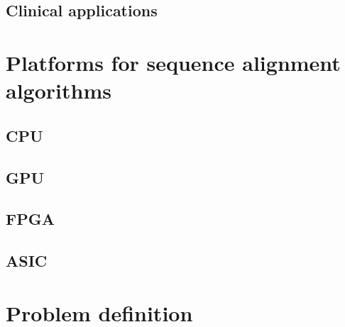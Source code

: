 \subsection{Clinical applications}


\section{Platforms for sequence alignment algorithms}

\subsection{CPU}
\subsection{GPU}
\subsection{FPGA}
\subsection{ASIC}

\section{Problem definition}